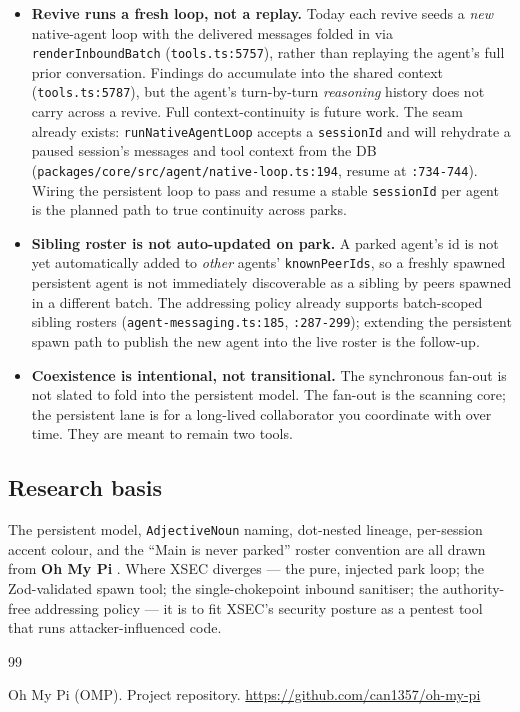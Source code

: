 \documentclass[11pt]{article}
\begin{document}
\begin{itemize}[leftmargin=*]
  \item \textbf{Revive runs a fresh loop, not a replay.} Today each revive seeds a
  \textit{new} native-agent loop with the delivered messages folded in via
  \texttt{renderInboundBatch} (\texttt{tools.ts:5757}), rather than replaying the
  agent's full prior conversation. Findings do accumulate into the shared context
  (\texttt{tools.ts:5787}), but the agent's turn-by-turn \textit{reasoning} history
  does not carry across a revive. Full context-continuity is future work. The seam
  already exists: \texttt{runNativeAgentLoop} accepts a \texttt{sessionId} and will
  rehydrate a paused session's messages and tool context from the DB
  (\texttt{packages/core/src/agent/native-loop.ts:194}, resume at \texttt{:734-744}).
  Wiring the persistent loop to pass and resume a stable \texttt{sessionId} per
  agent is the planned path to true continuity across parks.
  \item \textbf{Sibling roster is not auto-updated on park.} A parked agent's id is
  not yet automatically added to \textit{other} agents' \texttt{knownPeerIds}, so a
  freshly spawned persistent agent is not immediately discoverable as a sibling by
  peers spawned in a different batch. The addressing policy already supports
  batch-scoped sibling rosters (\texttt{agent-messaging.ts:185}, \texttt{:287-299});
  extending the persistent spawn path to publish the new agent into the live roster
  is the follow-up.
  \item \textbf{Coexistence is intentional, not transitional.} The synchronous
  fan-out is not slated to fold into the persistent model. The fan-out is the
  scanning core; the persistent lane is for a long-lived collaborator you
  coordinate with over time. They are meant to remain two tools.
\end{itemize}

\subsection{Research basis}

The persistent model, \texttt{AdjectiveNoun} naming, dot-nested lineage,
per-session accent colour, and the ``Main is never parked'' roster convention are
all drawn from \textbf{Oh My Pi} \citep{omp}. Where XSEC diverges --- the pure,
injected park loop; the Zod-validated spawn tool; the single-chokepoint inbound
sanitiser; the authority-free addressing policy --- it is to fit XSEC's security
posture as a pentest tool that runs attacker-influenced code.

\begin{thebibliography}{99}

Oh My Pi (OMP). Project repository.
\url{https://github.com/can1357/oh-my-pi}

\end{thebibliography}
\end{document}
